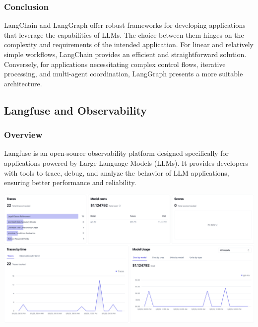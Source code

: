 \subsubsection{Conclusion}
LangChain and LangGraph offer robust frameworks for developing applications that leverage the capabilities of LLMs. The choice between them hinges on the complexity and requirements of the intended application. For linear and relatively simple workflows, LangChain provides an efficient and straightforward solution. Conversely, for applications necessitating complex control flows, iterative processing, and multi-agent coordination, LangGraph presents a more suitable architecture.

\subsection{Langfuse and Observability}

\subsubsection{Overview}
Langfuse is an open-source observability platform designed specifically for applications powered by Large Language Models (LLMs). It provides developers with tools to trace, debug, and analyze the behavior of LLM applications, ensuring better performance and reliability.

\begin{center}
    \centering
    \includegraphics[width=1\textwidth]{Images/Langfuse Overview.png}
     \cite{langfuseDashboard}
    \label{fig:langfuseDashboard}
\end{center}

